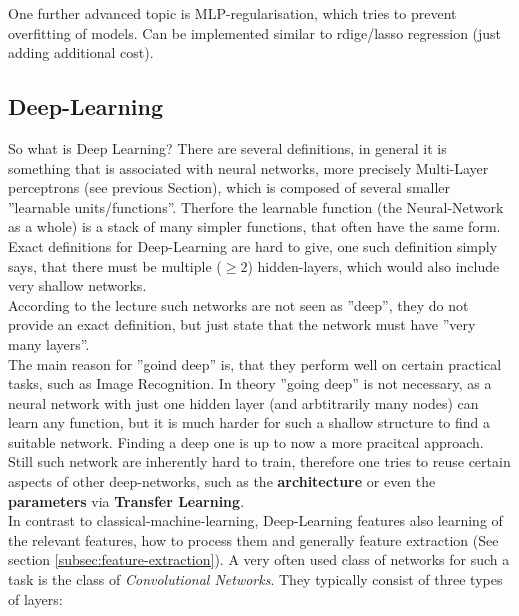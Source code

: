 \documentclass[12pt,a4paper]{article}
\begin{document}
\noindent One further advanced topic is MLP-regularisation, which tries to prevent overfitting of models. Can be implemented similar to rdige/lasso regression (just adding additional cost).\\

\subsection{Deep-Learning}

\noindent So what is Deep Learning? There are several definitions, in general it is something that is associated with neural networks, more precisely Multi-Layer perceptrons (see previous Section), which is composed of several smaller ''learnable units/functions''. Therfore the learnable function (the Neural-Network as a whole) is a stack of many simpler functions, that often have the same form.\\
\noindent Exact definitions for Deep-Learning are hard to give, one such definition simply says, that there must be multiple (\(\geq 2\)) hidden-layers, which would also include very shallow networks.\\
According to the lecture such networks are not seen as ''deep'', they do not provide an exact definition, but just state that the network must have ''very many layers''.\\[1em]
The main reason for ''goind deep'' is, that they perform well on certain practical tasks, such as Image Recognition. In theory ''going deep'' is not necessary, as a neural network with just one hidden layer (and arbtitrarily many nodes) can learn any function, but it is much harder for such a shallow structure to find a suitable network. Finding a deep one is up to now a more pracitcal approach.\\
Still such network are inherently hard to train, therefore one tries to reuse certain aspects of other deep-networks, such as the \textbf{architecture} or even the \textbf{parameters} via \textbf{Transfer Learning}.\\[1em]
In contrast to classical-machine-learning, Deep-Learning features also learning of the relevant features, how to process them and generally feature extraction (See section \ref{subsec:feature-extraction}). A very often used class of networks for such a task is the class of \textit{Convolutional Networks}. They typically consist of three types of layers:\\
\end{document}
